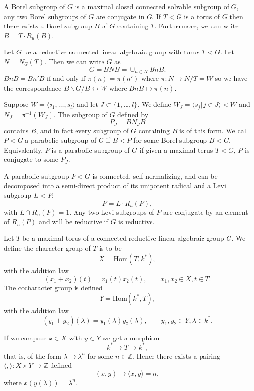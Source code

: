 A Borel subgroup of $G$ is a maximal closed connected solvable subgroup of $G$, any two Borel subgroups of $G$ are conjugate in $G$. If $T < G$ is a torus of $G$ then there exists a Borel subgroup $B$ of $G$ containing $T$. Furthermore, we can write $B = T\cdot R_u(B)$.

Let $G$ be a reductive connected linear algebraic group with torus $T < G$. Let $N = N_G(T)$. Then we can write $G$ as
\begin{displaymath}
	G = BNB = \cup_{n\in N}BnB.
\end{displaymath}
$BnB = Bn'B$ if and only if $\pi(n)=\pi(n')$ where $\pi:N\rightarrow N/T = W$ so we have the correspondence $B\backslash G/B \leftrightarrow W$ where $BnB \mapsto \pi(n)$.

Suppose $W = \langle s_1, \ldots, s_l\rangle$ and let $J \subset \{1, \ldots, l\}$. We define $W_J = \langle s_j |\, j\in J\rangle < W$ and $N_J = \pi^{-1}(W_J)$. The subgroup of $G$ defined by
\begin{displaymath}
	P_J = BN_JB
\end{displaymath}
contains $B$, and in fact every subgroup of $G$ containing $B$ is of this form. We call $P<G$ a parabolic subgroup of $G$ if $B<P$ for some Borel subgroup $B<G$. Equivalently, $P$ is a parabolic subgroup of $G$ if given a maximal torus $T<G$, $P$ is conjugate to some $P_J$. 

A parabolic subgroup $P<G$ is connected, self-normalizing, and can be decomposed into a semi-direct product of its unipotent radical and a Levi subgroup $L<P$:
\begin{displaymath}
	P = L\cdot R_u(P),
\end{displaymath}
with $L\cap R_u(P) = 1$. Any two Levi subgroups of $P$ are conjugate by an element of $R_u(P)$ and will be reductive if $G$ is reductive.

Let $T$ be a maximal torus of a connected reductive linear algebraic group $G$. We define the character group of $T$ is to be 
\begin{displaymath}
	X = \textrm{Hom}(T, k^*),
\end{displaymath}
with the addition law
\begin{displaymath}
	(x_1 + x_2)(t) = x_1(t)x_2(t),\qquad x_1, x_2\in X, t\in T.
\end{displaymath}
The cocharacter group is defined
\begin{displaymath}
	Y = \textrm{Hom}(k^*, T),
\end{displaymath}
with the addition law
\begin{displaymath}
	(y_1 + y_2)(\lambda) = y_1(\lambda)y_2(\lambda),\qquad y_1, y_2\in Y, \lambda \in k^*.
\end{displaymath}

If we compose $x\in X$ with $y\in Y$ we get a morphism
\begin{displaymath}
	k^*\rightarrow T \rightarrow k^*,
\end{displaymath}
that is, of the form $\lambda\mapsto \lambda^n$ for some $n\in \mathbb{Z}$. Hence there exists a pairing $\langle,\rangle:X\times Y\rightarrow \mathbb{Z}$ defined
\begin{displaymath}
	(x, y) \mapsto \langle x, y\rangle = n,
\end{displaymath}
where $x(y(\lambda)) = \lambda^n$. 
